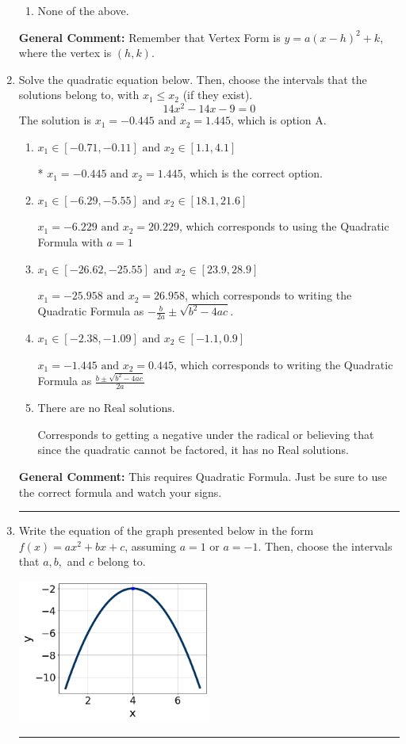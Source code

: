 \documentclass{extbook}[14pt]
\newcommand{\litem}[1]{\item #1

\rule{\textwidth}{0.4pt}}
\begin{document}
\begin{enumerate}
{\begin{enumerate}[label=\Alph*.]
\begin{multicols}{2}
\end{multicols}\item None of the above.\end{enumerate}
\textbf{General Comment:} Remember that Vertex Form is $y = a(x-h)^2+k$, where the vertex is $(h, k)$.
}
\litem{
Solve the quadratic equation below. Then, choose the intervals that the solutions belong to, with $x_1 \leq x_2$ (if they exist).
\[ 14x^{2} -14 x -9 = 0 \]The solution is \( x_1 = -0.445 \text{ and } x_2 = 1.445 \), which is option A.\begin{enumerate}[label=\Alph*.]
\item \( x_1 \in [-0.71, -0.11] \text{ and } x_2 \in [1.1, 4.1] \)

* $x_1 = -0.445 \text{ and } x_2 = 1.445$, which is the correct option.
\item \( x_1 \in [-6.29, -5.55] \text{ and } x_2 \in [18.1, 21.6] \)

 $x_1 = -6.229 \text{ and } x_2 = 20.229$, which corresponds to using the Quadratic Formula with $a=1$
\item \( x_1 \in [-26.62, -25.55] \text{ and } x_2 \in [23.9, 28.9] \)

 $x_1 = -25.958 \text{ and } x_2 = 26.958$, which corresponds to writing the Quadratic Formula as $-\frac{b}{2a} \pm \sqrt{b^2 - 4ac}$.
\item \( x_1 \in [-2.38, -1.09] \text{ and } x_2 \in [-1.1, 0.9] \)

 $x_1 = -1.445 \text{ and } x_2 = 0.445$, which corresponds to writing the Quadratic Formula as $\frac{b \pm \sqrt{b^2 - 4ac}}{2a}$
\item \( \text{There are no Real solutions.} \)

Corresponds to getting a negative under the radical or believing that since the quadratic cannot be factored, it has no Real solutions.
\end{enumerate}

\textbf{General Comment:} This requires Quadratic Formula. Just be sure to use the correct formula and watch your signs.
}
\litem{
Write the equation of the graph presented below in the form $f(x)=ax^2+bx+c$, assuming  $a=1$ or $a=-1$. Then, choose the intervals that $a, b,$ and $c$ belong to.

\begin{center}
    \includegraphics[width=0.5\textwidth]{../Figures/quadraticGraphToEquationA.png}
\end{center}


}
\end{enumerate}
\end{document}
